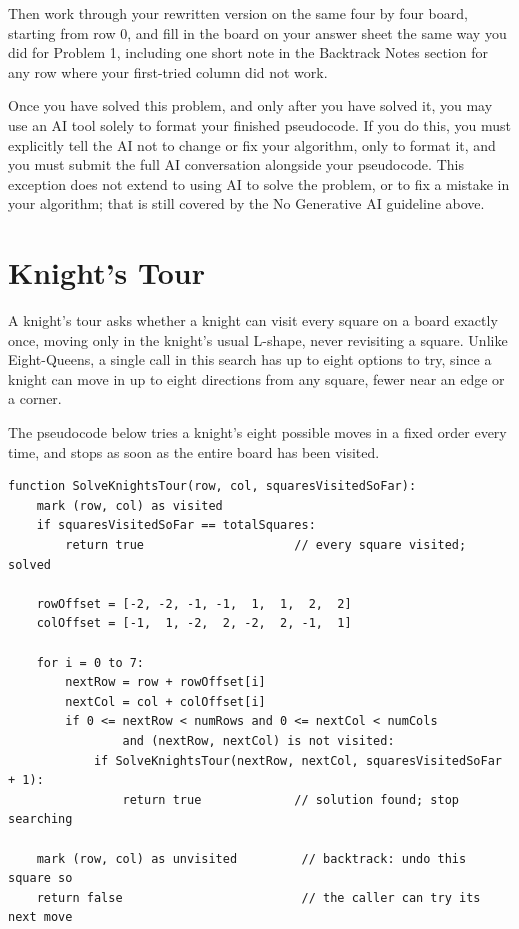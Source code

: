 \documentclass[11pt]{article}
\begin{document}
Then work through your rewritten version on the same four by four board,
starting from row 0, and fill in the board on your answer sheet the same
way you did for Problem 1, including one short note in the Backtrack Notes
section for any row where your first-tried column did not work.

Once you have solved this problem, and only after you have solved it, you
may use an AI tool solely to format your finished pseudocode. If you do
this, you must explicitly tell the AI not to change or fix your algorithm,
only to format it, and you must submit the full AI conversation alongside
your pseudocode. This exception does not extend to using AI to solve the
problem, or to fix a mistake in your algorithm; that is still covered by
the No Generative AI guideline above.

\section{Knight's Tour}
\label{sec:knights-tour}

A knight's tour asks whether a knight can visit every square on a board
exactly once, moving only in the knight's usual L-shape, never revisiting a
square. Unlike Eight-Queens, a single call in this search has up to eight
options to try, since a knight can move in up to eight directions from any
square, fewer near an edge or a corner.

The pseudocode below tries a knight's eight possible moves in a fixed order
every time, and stops as soon as the entire board has been visited.

\begin{lstlisting}
function SolveKnightsTour(row, col, squaresVisitedSoFar):
    mark (row, col) as visited
    if squaresVisitedSoFar == totalSquares:
        return true                     // every square visited; solved

    rowOffset = [-2, -2, -1, -1,  1,  1,  2,  2]
    colOffset = [-1,  1, -2,  2, -2,  2, -1,  1]

    for i = 0 to 7:
        nextRow = row + rowOffset[i]
        nextCol = col + colOffset[i]
        if 0 <= nextRow < numRows and 0 <= nextCol < numCols
                and (nextRow, nextCol) is not visited:
            if SolveKnightsTour(nextRow, nextCol, squaresVisitedSoFar + 1):
                return true             // solution found; stop searching

    mark (row, col) as unvisited         // backtrack: undo this square so
    return false                         // the caller can try its next move
\end{lstlisting}
\end{document}
